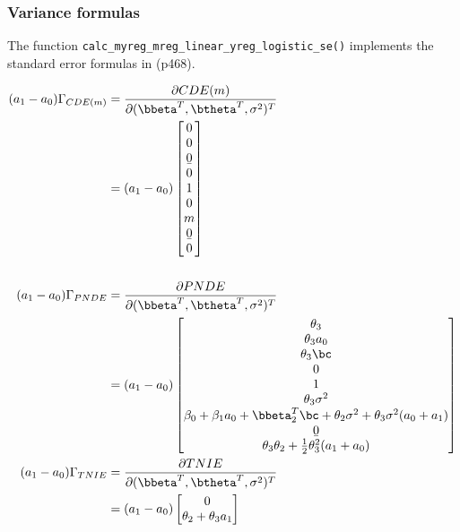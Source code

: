\documentclass[dvipdfmx,10pt]{article}
\begin{document}
\subsubsection{Variance formulas}
\label{sec:org8eeba94}
The function \texttt{calc\_myreg\_mreg\_linear\_yreg\_logistic\_se()} implements the standard error formulas in \cite{vanderweeleExplanationCausalInference2015} (p468).

\begin{align*}
  (a_{1}-a_{0})\Gamma_{CDE(m)}
  &= \frac{\partial CDE(m)}{\partial (\bbeta^{T},\btheta^{T},\sigma^2)^{T}}\\
  &= (a_{1}-a_{0})
    \begin{bmatrix}
      0\\
      0\\
      \b0\\
      0\\
      1\\
      0\\
      m\\
      \b0\\
      0\\
    \end{bmatrix}\\
  \\
  (a_{1}-a_{0})\Gamma_{PNDE}
  &= \frac{\partial PNDE}{\partial (\bbeta^{T},\btheta^{T},\sigma^2)^{T}}\\
  &= (a_{1}-a_{0})
    \begin{bmatrix}
      \theta_{3}\\
      \theta_{3}a_{0}\\
      \theta_{3}\bc\\
      0\\
      1\\
      \theta_{3}\sigma^{2}\\
      \beta_{0} + \beta_{1}a_{0} + \bbeta_{2}^{T}\bc + \theta_{2}\sigma^{2} + \theta_{3}\sigma^{2}(a_{0} + a_{1})\\
      \b0\\
      \theta_{3}\theta_{2} + \frac{1}{2}\theta_{3}^{2}(a_{1} + a_{0})\\
    \end{bmatrix}\\
  (a_{1}-a_{0})\Gamma_{TNIE}
  &= \frac{\partial TNIE}{\partial (\bbeta^{T},\btheta^{T},\sigma^2)^{T}}\\
  &= (a_{1}-a_{0})
    \begin{bmatrix}
      0\\
      \theta_{2} + \theta_{3}a_{1}\\

\end{bmatrix}
\end{align*}
\end{document}
